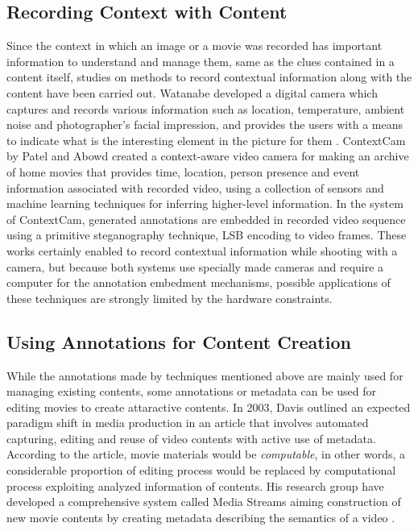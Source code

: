\subsection{Recording Context with Content}
Since the context in which an image or a movie was recorded has important information to understand and manage them, same as the clues contained in a content itself, studies on methods to record contextual information along with the content have been carried out.
Watanabe developed a digital camera which captures and records various information such as location, temperature, ambient noise and photographer's facial impression, and provides the users with a means to indicate what is the interesting element in the picture for them \cite{Watanabe:2007:WDC:1240866.1241073}.
ContextCam by Patel and Abowd \cite{Patel04thecontextcam:} created a context-aware video camera for making an archive of home movies that provides time, location, person presence and event information associated with recorded video, using a collection of sensors and machine learning techniques for inferring higher-level information.
In the system of ContextCam, generated annotations are embedded in recorded video sequence using a primitive steganography technique, LSB encoding to video frames.
These works certainly enabled to record contextual information while shooting with a camera, but because both systems use specially made cameras and require a computer for the annotation embedment mechanisms, possible applications of these techniques are strongly limited by the hardware constraints.

\subsection{Using Annotations for Content Creation}
While the annotations made by techniques mentioned above are mainly used for managing existing contents, some annotations or metadata can be used for editing movies to create attaractive contents.
In 2003, Davis outlined an expected paradigm shift in media production in an article \cite{davis2003editing} that involves automated capturing, editing and reuse of video contents with active use of metadata.
According to the article, movie materials would be {\it computable}, in other words, a considerable proportion of editing process would be replaced by computational process exploiting analyzed information of contents.
His research group have developed a comprehensive system called Media Streams aiming construction of new movie contents by creating metadata describing the semantics of a video \cite{davis2000media}.

